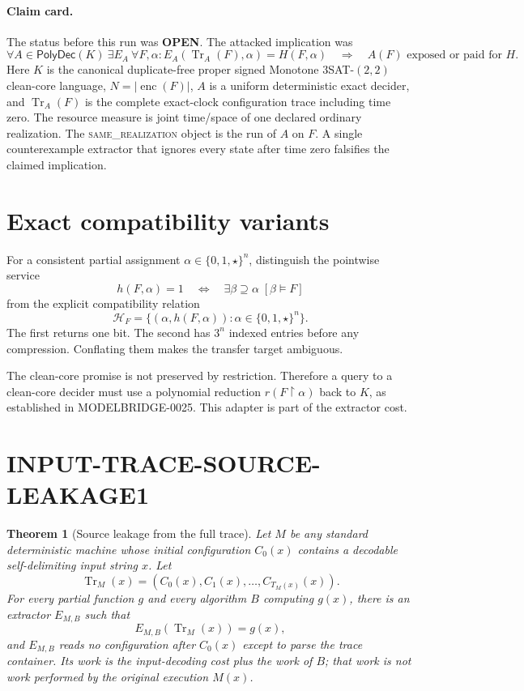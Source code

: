 \documentclass[11pt]{article}
\newtheorem{theorem}{Theorem}
\newcommand{\OPEN}{\textbf{OPEN}}
\newcommand{\same}{\textsc{same\_realization}}
\begin{document}
\paragraph{Claim card.}
The status before this run was \OPEN.  The attacked implication was
\[
 \forall A\in\mathsf{PolyDec}(K)\ \exists E_A\ \forall F,\alpha:
 E_A(\operatorname{Tr}_A(F),\alpha)=H(F,\alpha)
 \quad\Longrightarrow\quad
 A(F)\text{ exposed or paid for }H.                       \tag{1}
\]
Here $K$ is the canonical duplicate-free proper signed Monotone
$3$SAT-$(2,2)$ clean-core language, $N=|\operatorname{enc}(F)|$, $A$ is a
uniform deterministic exact decider, and $\operatorname{Tr}_A(F)$ is the
complete exact-clock configuration trace including time zero.  The resource
measure is joint time/space of one declared ordinary realization.  The
\same{} object is the run of $A$ on $F$.  A single counterexample extractor
that ignores every state after time zero falsifies the claimed implication.

\section{Exact compatibility variants}
For a consistent partial assignment $\alpha\in\{0,1,\star\}^n$, distinguish
the pointwise service
\[
 h(F,\alpha)=1
 \quad\Longleftrightarrow\quad
 \exists\beta\supseteq\alpha\;[\beta\models F]             \tag{2}
\]
from the explicit compatibility relation
\[
 \mathcal H_F=\{(\alpha,h(F,\alpha)):
                 \alpha\in\{0,1,\star\}^n\}.              \tag{3}
\]
The first returns one bit.  The second has $3^n$ indexed entries before any
compression.  Conflating them makes the transfer target ambiguous.

The clean-core promise is not preserved by restriction.  Therefore a query
to a clean-core decider must use a polynomial reduction
$r(F\upharpoonright\alpha)$ back to $K$, as established in
MODELBRIDGE-0025.  This adapter is part of the extractor cost.

\section{INPUT-TRACE-SOURCE-LEAKAGE1}
\begin{theorem}[Source leakage from the full trace]
Let $M$ be any standard deterministic machine whose initial configuration
$C_0(x)$ contains a decodable self-delimiting input string $x$.  Let
\[
 \operatorname{Tr}_M(x)=(C_0(x),C_1(x),\ldots,C_{T_M(x)}(x)).
\]
For every partial function $g$ and every algorithm $B$ computing $g(x)$,
there is an extractor $E_{M,B}$ such that
\[
 E_{M,B}(\operatorname{Tr}_M(x))=g(x),                     \tag{4}
\]
and $E_{M,B}$ reads no configuration after $C_0(x)$ except to parse the trace
container.  Its work is the input-decoding cost plus the work of $B$; that
work is not work performed by the original execution $M(x)$.
\end{theorem}
\end{document}
